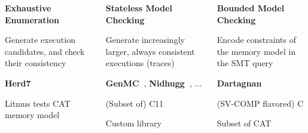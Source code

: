 {
\vspace{1.4cm}
\centering
\smaller
\begin{columns}%
    \begin{column}{0.3\textwidth}%
        \centering
        
        \begin{block}{ \centering \bfseries
            Exhaustive Enumeration}

            Generate execution candidates, and check their consistency

        \end{block}

        \textbf{Herd7~\cite{herd}}\\{}
        
        Litmus tests
        CAT memory model         
        
    \end{column}%
    \hfill%
    \begin{column}{0.33\textwidth}%
        \centering

        \begin{block}{ \centering \bfseries
            Stateless Model Checking}
            
            Generate increasingly larger, always consistent executions (traces)

        \end{block}

        \textbf{GenMC~\cite{genmc}}, \textbf{Nidhugg~\cite{nidhugg}}, $\dots$\\{\smaller{}}

        
        (Subset of) C11
        
        Custom library

    \end{column}%
    \hfill%
    \begin{column}{0.3\textwidth}%
        \centering

        \begin{block}{ \centering \bfseries
            Bounded Model Checking}
            
            Encode constraints of the memory model in the SMT query
        
        \end{block}

        \textbf{Dartagnan~\cite{dartagnan}}

        (SV-COMP flavored) C
        
        Subset of CAT 
        

    \end{column}%
\end{columns}

\vspace{1.45cm}
}